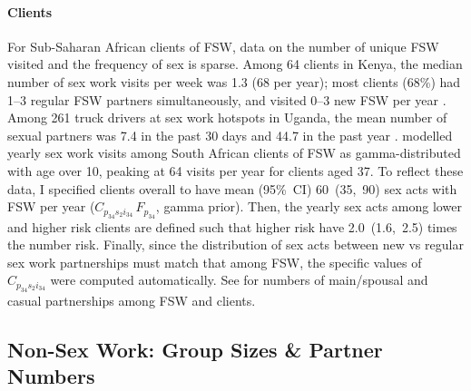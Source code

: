 \paragraph{Clients}
For Sub-Saharan African clients of FSW, data on
the number of unique FSW visited and the frequency of sex is sparse.
Among 64 clients in Kenya,
the median number of sex work visits per week was 1.3 (68 per year);
most clients (68\%) had 1--3 regular FSW partners simultaneously, and
visited 0--3 new FSW per year \cite{Voeten2002}.
Among 261 truck drivers at sex work hotspots in Uganda,
the mean number of sexual partners was
7.4 in the past 30 days and 44.7 in the past year \cite{Matovu2012}.
\citet{Johnson2017} modelled yearly sex work visits among South African clients of FSW as
gamma-distributed with age over 10, peaking at 64 visits per year for clients aged 37.
To reflect these data, I specified clients overall to have
mean (95\%~CI) 60~(35,~90) sex acts with FSW per year
($C_{p_{34}s_{2}i_{34}}\,F_{p_{34}}$, gamma prior).
Then, the yearly sex acts among lower and higher risk clients are defined such that
higher risk have 2.0~(1.6,~2.5) times the number risk.
Finally, since the distribution of sex acts between new vs regular sex work partnerships
must match that among FSW, the specific values of $C_{p_{34}s_{2}i_{34}}$
were computed automatically.
See  for numbers of main/spousal and casual partnerships
among FSW and clients.
\subsection{Non-Sex Work: Group Sizes \& Partner Numbers}\label{model.par.nsw}
